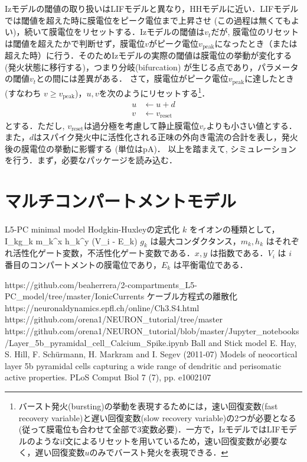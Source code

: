 Izモデルの閾値の取り扱いはLIFモデルと異なり，HHモデルに近い．LIFモデルでは閾値を超えた時に膜電位をピーク電位まで上昇させ (この過程は無くてもよい)，続いて膜電位をリセットする．Izモデルの閾値は$v_t$だが, 膜電位のリセットは閾値を超えたかで判断せず，膜電位$v$がピーク電位$v_{\text{peak}}$になったとき（または超えた時）に行う．そのためIzモデルの実際の閾値は膜電位の挙動が変化する(発火状態に移行する)，つまり分岐(bifurcation) が生じる点であり，パラメータの閾値$v_t$との間には差異がある．
さて，膜電位がピーク電位$v_{\text{peak}}$に達したとき (すなわち  $v \geq v_{\text{peak}}$)，$u, v$を次のようにリセットする\footnote{バースト発火(bursting)の挙動を表現するためには，速い回復変数(fast recovery variable)と遅い回復変数(slow recovery variable)の2つが必要となる(従って膜電位も合わせて全部で3変数必要)．一方で，IzモデルではLIFモデルのようなif文によるリセットを用いているため，速い回復変数が必要なく，遅い回復変数$u$のみでバースト発火を表現できる．}．
\begin{align} 
u&\leftarrow u+d\\
v&\leftarrow v_{\text{reset}}
\end{align}
とする．ただし, $v_{\text{reset}}$は過分極を考慮して静止膜電位$v_r$よりも小さい値とする．また，$d$はスパイク発火中に活性化される正味の外向き電流の合計を表し，発火後の膜電位の挙動に影響する (単位はpA)．
以上を踏まえて, シミュレーションを行う．まず，必要なパッケージを読み込む．
\section{マルチコンパートメントモデル}
L5-PC minimal model
Hodgkin-Huxleyの定式化
$k$ をイオンの種類として，
I_k\coloneqq g_k m_k^x h_k^y (V_i - E_k)
$g_k$ は最大コンダクタンス，$m_k, h_k$ はそれぞれ活性化ゲート変数，不活性化ゲート変数である．$x, y$ は指数である．$V_i$ は $i$ 番目のコンパートメントの膜電位であり，$E_k$ は平衡電位である．
 
https://github.com/beaherrera/2-compartments_L5-PC_model/tree/master/IonicCurrents
ケーブル方程式の離散化
https://neuronaldynamics.epfl.ch/online/Ch3.S4.html
https://github.com/orena1/NEURON_tutorial/tree/master
https://github.com/orena1/NEURON_tutorial/blob/master/Jupyter_notebooks/Layer_5b_pyramidal_cell_Calcium_Spike.ipynb
Ball and Stick model
 E. Hay, S. Hill, F. Schürmann, H. Markram and I. Segev (2011-07) Models of neocortical layer 5b pyramidal cells capturing a wide range of dendritic and perisomatic active properties. PLoS Comput Biol 7 (7), pp. e1002107
 
